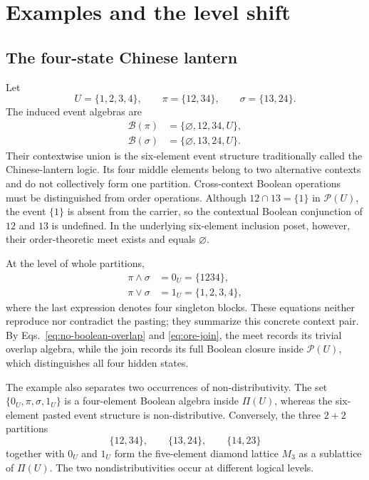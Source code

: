 \documentclass[aps,pra,reprint,nofootinbib]{revtex4-2}
\newcommand{\Pow}{\mathcal{P}}
\newcommand{\Part}{\Pi}
\newcommand{\BA}{\mathcal{B}}
\begin{document}
\section{Examples and the level shift}

\subsection{The four-state Chinese lantern}

Let
\begin{equation}
  U=\{1,2,3,4\},\qquad
  \pi=\{12,34\},\qquad
  \sigma=\{13,24\}.
  \label{eq:four-partitions}
\end{equation}
The induced event algebras are
\begin{align}
  \BA(\pi)&=\{\varnothing,12,34,U\},\\
  \BA(\sigma)&=\{\varnothing,13,24,U\}.
\end{align}
Their contextwise union is the six-element event structure traditionally
called the Chinese-lantern logic.  Its four middle elements belong to two
alternative contexts and do not collectively form one partition.
Cross-context Boolean operations must be distinguished from order operations.
Although $12\cap13=\{1\}$ in $\Pow(U)$, the event $\{1\}$ is absent from the
carrier, so the contextual Boolean conjunction of $12$ and $13$ is undefined.
In the underlying six-element inclusion poset, however, their order-theoretic
meet exists and equals $\varnothing$.

At the level of whole partitions,
\begin{align}
  \pi\wedge\sigma&=0_U=\{1234\},
  \label{eq:four-meet}\\
  \pi\vee\sigma&=1_U=\{1,2,3,4\},
  \label{eq:four-join}
\end{align}
where the last expression denotes four singleton blocks.  These equations
neither reproduce nor contradict the pasting; they summarize this concrete
context pair.  By Eqs.~\eqref{eq:no-boolean-overlap} and \eqref{eq:ore-join},
the meet records its trivial overlap algebra, while the join records its full
Boolean closure inside $\Pow(U)$, which distinguishes all four hidden states.

The example also separates two occurrences of non-distributivity.  The set
$\{0_U,\pi,\sigma,1_U\}$ is a four-element Boolean algebra inside
$\Part(U)$, whereas the six-element pasted event structure is
non-distributive.  Conversely, the three $2+2$ partitions
\begin{equation}
  \{12,34\},\qquad\{13,24\},\qquad\{14,23\}
\end{equation}
together with $0_U$ and $1_U$ form the five-element diamond lattice $M_3$ as a
sublattice of $\Part(U)$.  The two
nondistributivities occur at different logical levels.
\end{document}
